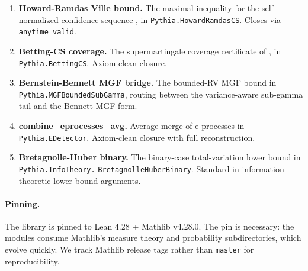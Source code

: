 \begin{enumerate}[leftmargin=1.3em,itemsep=0.2em]
\item \textbf{Howard-Ramdas Ville bound.} The maximal inequality for
  the self-normalized confidence sequence
  \citep{howard2021time}, in
  \texttt{Pythia.HowardRamdasCS}. Closes via \texttt{anytime\_valid}.
\item \textbf{Betting-CS coverage.} The supermartingale coverage
  certificate of \citet{waudbysmith2024estimating}, in
  \texttt{Pythia.BettingCS}. Axiom-clean closure.
\item \textbf{Bernstein-Bennett MGF bridge.} The bounded-RV MGF bound
  in \texttt{Pythia.MGFBoundedSubGamma}, routing between the
  variance-aware sub-gamma tail and the Bennett MGF form.
\item \textbf{combine\_eprocesses\_avg.} Average-merge of e-processes
  \citep{ramdasgrunwaldvovkshafer2023, shinramdasrinaldo2024} in
  \texttt{Pythia.EDetector}. Axiom-clean closure with full
  reconstruction.
\item \textbf{Bretagnolle-Huber binary.} The binary-case
  total-variation lower bound in
  \texttt{Pythia.InfoTheory.} \texttt{BretagnolleHuberBinary}. Standard in
  information-theoretic lower-bound arguments.
\end{enumerate}

\paragraph{Pinning.}
The library is pinned to Lean 4.28 + Mathlib v4.28.0. The pin is
necessary: the modules consume Mathlib's measure theory and
probability subdirectories, which evolve quickly. We track Mathlib
release tags rather than \texttt{master} for reproducibility.
